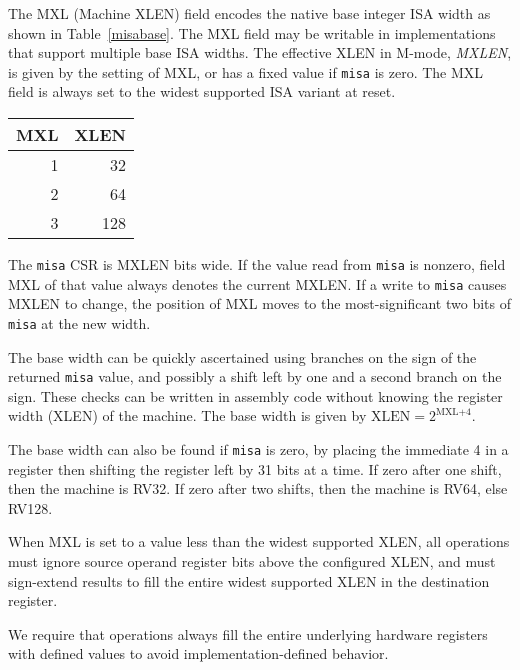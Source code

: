 The MXL (Machine XLEN) field encodes the native base integer ISA width
as shown in Table~\ref{misabase}.  The MXL field may be writable in
implementations that support multiple base ISA widths.  The effective
XLEN in M-mode, {\em MXLEN}, is given by the setting of MXL, or has a
fixed value if {\tt misa} is zero.  The MXL field is always set to the
widest supported ISA variant at reset.

\begin{table*}[h!]
\begin{center}
\begin{tabular}{|r|r|}
\hline
MXL  & XLEN \\
\hline	 
1   & 32 \\
2   & 64 \\
3   & 128 \\
\hline
\end{tabular}
\end{center}
\caption{Encoding of MXL field in {\tt misa}}
\label{misabase}
\end{table*}

The {\tt misa} CSR is MXLEN bits wide.  If the value read from {\tt misa} is
nonzero, field MXL of that value always denotes the current MXLEN. If a write
to {\tt misa} causes MXLEN to change, the position of MXL moves to the
most-significant two bits of {\tt misa} at the new width.

\begin{commentary}
The base width can be quickly ascertained using branches on the sign
of the returned {\tt misa} value, and possibly a shift left by one and
a second branch on the sign.  These checks can be written in assembly
code without knowing the register width (XLEN) of the machine.  The
base width is given by $\mbox{XLEN}=2^{\mbox{MXL+4}}$.

The base width can also be found if {\tt misa} is zero, by placing the
immediate 4 in a register then shifting the register left by 31 bits
at a time.  If zero after one shift, then the machine is RV32.  If
zero after two shifts, then the machine is RV64, else RV128.
\end{commentary}

When MXL is set to a value less than the widest supported XLEN, all
operations must ignore source operand register bits above the
configured XLEN, and must sign-extend results to fill the entire
widest supported XLEN in the destination register.

\begin{commentary}
We require that operations always fill the entire underlying hardware
registers with defined values to avoid implementation-defined
behavior.
\end{commentary}


